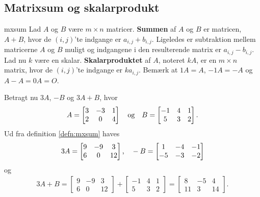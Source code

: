 \subsection{Matrixsum og skalarprodukt}
%
\begin{defn}{}{mxsum}
Lad $A$ og $B$ være $m \times n$ matricer.
\textbf{Summen} af $A$ og $B$  er matricen, $A + B$, hvor de $(i,j)$'te indgange er $a_{i,j} + b_{i,j}$.
Ligeledes er subtraktion mellem matricerne $A$ og $B$ muligt og indgangene i den resulterende matrix er $a_{i,j} - b_{i,j}$.
Lad nu $k$ være en skalar.
\textbf{Skalarproduktet} af $A$, noteret $kA$, er en $m \times n$ matrix, hvor de $(i,j)$'te indgange er $ka_{i,j}$.
Bemærk at $1A = A$, $-1A = -A$ og $A - A = 0A = O$.
\end{defn}
%
\begin{eks}
Betragt nu $3A$, $-B$ og $3A+B$, hvor 
\begin{align*}
A= 
\begin{bmatrix}
3	&	-3	&	1\\
2	&	0	&	4
\end{bmatrix}
\text{\phantom{---}og\phantom{---}}
B= 
\begin{bmatrix}
-1	&	4	&	1\\
5	&	3	&	2
\end{bmatrix}.
\end{align*}
Ud fra definition \ref{defn:mxsum} haves
\begin{align*}
3A= 
\begin{bmatrix}
9	&	-9	&	3\\
6	&	0	&	12
\end{bmatrix}
\text{,\phantom{---}}
-B= 
\begin{bmatrix}
1	&	-4	&	-1\\
-5	&	-3	&	-2
\end{bmatrix}
\end{align*}
og
\begin{align*}
3A+B= 
\begin{bmatrix}
9	&	-9	&	3\\
6	&	0	&	12
\end{bmatrix}
+ 
\begin{bmatrix}
-1	&	4	&	1\\
5	&	3	&	2
\end{bmatrix}
=
\begin{bmatrix}
8	&	-5	&	4\\
11	&	3	&	14
\end{bmatrix}.
\end{align*}
\end{eks}
